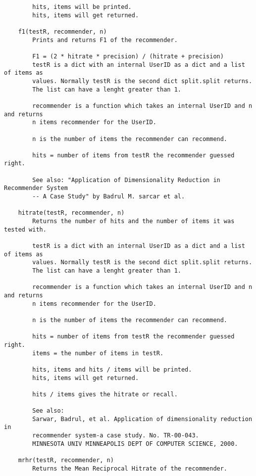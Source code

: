 \begin{lstlisting}
        hits, items will be printed.
        hits, items will get returned.
    
    f1(testR, recommender, n)
        Prints and returns F1 of the recommender.
        
        F1 = (2 * hitrate * precision) / (hitrate + precision)
        testR is a dict with an internal UserID as a dict and a list of items as
        values. Normally testR is the second dict split.split returns.
        The list can have a lenght greater than 1.
        
        recommender is a function which takes an internal UserID and n and returns
        n items recommender for the UserID.
        
        n is the number of items the recommender can recommend.
        
        hits = number of items from testR the recommender guessed right.
        
        See also: "Application of Dimensionality Reduction in Recommender System
        -- A Case Study" by Badrul M. sarcar et al.
    
    hitrate(testR, recommender, n)
        Returns the number of hits and the number of items it was tested with.
        
        testR is a dict with an internal UserID as a dict and a list of items as
        values. Normally testR is the second dict split.split returns.
        The list can have a lenght greater than 1.
        
        recommender is a function which takes an internal UserID and n and returns
        n items recommender for the UserID.
        
        n is the number of items the recommender can recommend.
        
        hits = number of items from testR the recommender guessed right.
        items = the number of items in testR.
        
        hits, items and hits / items will be printed.
        hits, items will get returned.
        
        hits / items gives the hitrate or recall.
        
        See also:
        Sarwar, Badrul, et al. Application of dimensionality reduction in
        recommender system-a case study. No. TR-00-043.
        MINNESOTA UNIV MINNEAPOLIS DEPT OF COMPUTER SCIENCE, 2000.
    
    mrhr(testR, recommender, n)
        Returns the Mean Reciprocal Hitrate of the recommender.
        

\end{lstlisting}
